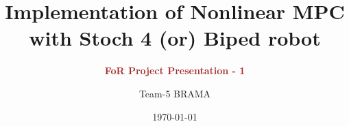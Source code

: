 \title[NMPC Implementation]{
    \textbf{Implementation of Nonlinear MPC \\
    with Stoch 4 (or) Biped robot}
}
\subtitle[Presentation]{\textcolor{brown}{
    \textbf{FoR Project Presentation - 1} \\
}}
\author[BRAMA]{%
    Team-5 BRAMA
}
\date{\today}
